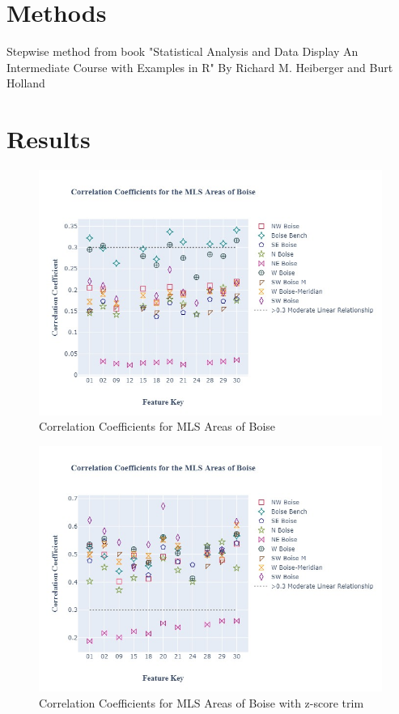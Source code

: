 \documentclass{article}
\begin{document}
\section{Methods}

Stepwise method from book "Statistical Analysis and Data Display An Intermediate Course with Examples in R" By Richard M. Heiberger and Burt Holland 



\section{Results}










\begin{figure}[H]
    \centering
    \includegraphics[width= .7\linewidth]{images/Area_fig.jpg}
    \caption{Correlation Coefficients for MLS Areas of Boise}
    \label{fig: area_ccl}
\end{figure}

\begin{figure}[H]
    \centering
    \includegraphics[width= .7\linewidth]{images/Ex_Area_fig.jpg}
    \caption{Correlation Coefficients for MLS Areas of Boise with z-score trim}
    \label{fig: area_ccl-z}
\end{figure}
\end{document}
